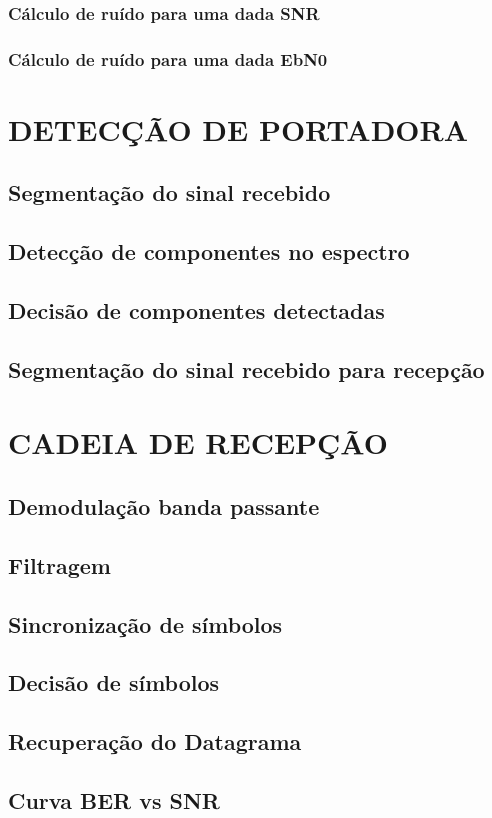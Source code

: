 \subsubsection{Cálculo de ruído para uma dada SNR}\label{sec:calculo_ruido}

\subsubsection{Cálculo de ruído para uma dada EbN0}\label{sec:calculo_ruido_ebn0}

\section{DETECÇÃO DE PORTADORA}\label{sec:detector}

\subsection{Segmentação do sinal recebido}\label{sec:segmentacao}

\subsection{Detecção de componentes no espectro}\label{sec:comparacao_potencia}

\subsection{Decisão de componentes detectadas}\label{sec:decisao}

\subsection{Segmentação do sinal recebido para recepção}\label{sec:segmentacao_recepcao}

\section{CADEIA DE RECEPÇÃO}\label{sec:recepcao}    

\subsection{Demodulação banda passante}\label{sec:demodulacao}

\subsection{Filtragem}\label{sec:filtragem}

\subsection{Sincronização de símbolos}\label{sec:sincronizacao}

\subsection{Decisão de símbolos}\label{sec:decisao_simbolos}

\subsection{Recuperação do Datagrama}\label{sec:decodificacao_convolucional}

\subsection{Curva BER vs SNR}\label{sec:bersnr}